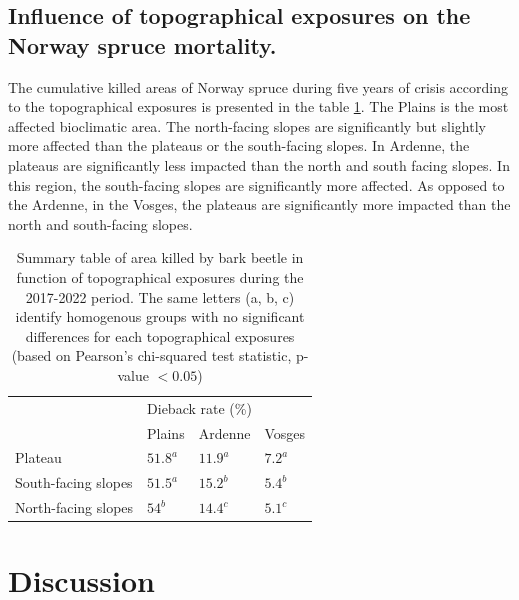 \documentclass[3p,procedia]{elsarticle}
\begin{document}
\subsection{Influence of topographical exposures on the Norway spruce mortality.}
The cumulative killed areas of Norway spruce during five years of crisis according to the topographical exposures is presented in the table \ref{tab_or_topo}.
The Plains is the most affected bioclimatic area. 
The north-facing slopes are significantly but slightly more  affected than the plateaus or the south-facing slopes.
In Ardenne, the plateaus are significantly less impacted than the north and south facing slopes. 
In this region, the south-facing slopes are significantly more affected. 
As opposed to the Ardenne, in the Vosges, the plateaus are significantly more impacted than the north and south-facing slopes.
\begin{table}[htbp]
\caption{Summary table of area killed by bark beetle in function of topographical exposures during the 2017-2022 period.
The same letters (a, b, c) identify homogenous groups with no significant differences for each topographical exposures  (based on  Pearson's chi-squared test statistic, p-value $< 0.05$)}
\label{tab_or_topo}

\begin{tabular}{|l|lll|}
\hline
\multirow{2}{*}{}  & \multicolumn{3}{l|}{Dieback rate (\%)}                             \\ \cline{2-4} 
                   & \multicolumn{1}{l|}{Plains} & \multicolumn{1}{l|}{Ardenne} & Vosges \\ \hline
Plateau            & \multicolumn{1}{l|}{$51.8^a$ }    & \multicolumn{1}{l|}{$11.9^a$}    & $7.2^a$   \\ \hline
South-facing slopes & \multicolumn{1}{l|}{$51.5^a$}   & \multicolumn{1}{l|}{$15.2^b$}    & $5.4^b$    \\ \hline
North-facing slopes & \multicolumn{1}{l|}{$54^b$}   & \multicolumn{1}{l|}{$14.4^c$}    & $5.1^c$   \\ \hline
\end{tabular}
\end{table}

   

\section{Discussion}
\end{document}
